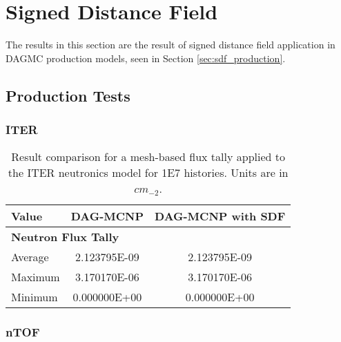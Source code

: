   
  \section{Signed Distance Field}

  The results in this section are the result of signed distance field
  application in DAGMC production models, seen in Section
  \ref{sec:sdf_production}. 
  
\subsection{Production Tests}

\subsubsection{ITER}

\begin{table}[H]
  \small
  \begin{center}
    \begin{tabular}{lcc}
          \toprule
          Value   & DAG-MCNP     & DAG-MCNP with SDF      \\
          \toprule
          \multicolumn{3}{l}{\textbf{Neutron Flux Tally}} \\
          Average & 2.123795E-09 & 2.123795E-09           \\
          Maximum & 3.170170E-06 & 3.170170E-06           \\
          Minimum & 0.000000E+00 & 0.000000E+00           \\
          \bottomrule
    \end{tabular}
  \end{center}
  \caption[Flux tally results in the ITER model for various DAG-MCNP
    implementations.]{Result comparison for a mesh-based flux tally applied to
    the ITER neutronics model for \num{1E7} histories. Units are in $cm_{-2}$.}
\end{table}


\subsubsection{nTOF}

